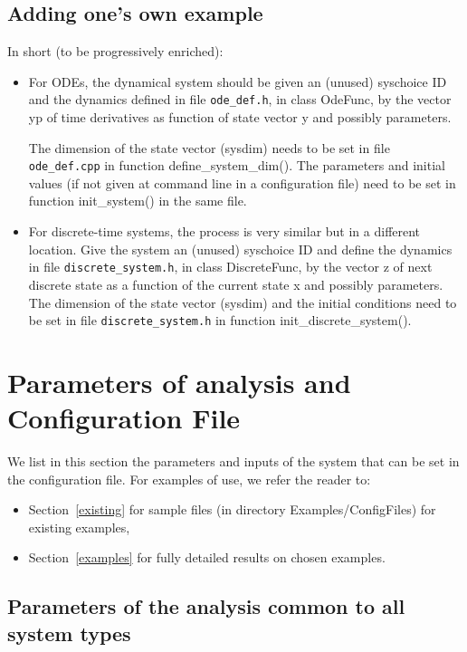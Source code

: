 \documentclass{article}
\begin{document}
\subsection{Adding one's own example}
In short (to be progressively enriched):
\begin{itemize}[noitemsep]
\item For ODEs,  the dynamical system should be given an (unused) syschoice ID and the dynamics defined in file \texttt{ode\_def.h}, in class OdeFunc,  by the vector yp  of time derivatives as function of state vector y and possibly parameters.  

The dimension of the state vector (sysdim) needs to be set in file \texttt{ode\_def.cpp} in function define\_system\_dim(). The parameters and initial values (if not given at command line in a configuration file) need to be set in function init\_system() in the same file. 

\item For discrete-time systems, the process is very similar but in a different location. Give the system  an (unused) syschoice ID and define the dynamics in file \texttt{discrete\_system.h}, in class DiscreteFunc, by the vector z of next discrete state as a function of the current state x and possibly parameters. 
The dimension of the state vector (sysdim) and the initial conditions need to be set in file \texttt{discrete\_system.h}  in function init\_discrete\_system().  
\end{itemize}


\section{Parameters of analysis and Configuration File \label{params}}
We list in this section the parameters and inputs of the system that can be set in the configuration file.  For examples of use, we refer the reader to:
\begin{itemize}[noitemsep]
\item Section~\ref{existing} for sample files (in directory Examples/ConfigFiles) for existing examples,
\item Section~\ref{examples} for fully detailed results on chosen examples.
\end{itemize}
\subsection{Parameters of the analysis common to all system types}
\end{document}
